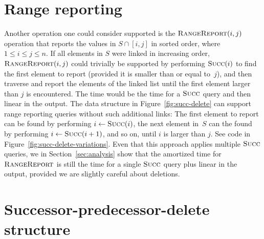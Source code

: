 \documentclass[a4paper]{lipics-v2021}
\newcommand{\FuncName}[1]{\textup{\textsc{#1}}}
\newcommand{\Succ}{\FuncName{Succ}}
\newcommand{\RangeReport}{\FuncName{RangeReport}}
\begin{document}
\section{Range reporting}
\label{sec:range}

Another operation one could consider supported is the $\RangeReport(i, j)$ operation that reports the values in $S \cap [i,j]$ in sorted order, where $1\leq i \leq j\leq n$. If all elements in $S$ were linked in increasing order, $\RangeReport(i, j)$ could trivially be supported by performing $\Succ(i)$ to find the first element to report (provided it is smaller than or equal to~$j$), and then traverse and report the elements of the linked list until the first element larger than $j$ is encountered. The time would be the time for a $\Succ$ query and then linear in the output. The data structure in Figure~\ref{fig:succ-delete} can support range reporting queries without such additional links: The first element to report can be found by performing $i\leftarrow\Succ(i)$, the next element in~$S$ can the found by performing $i\leftarrow\Succ(i+1)$, and so on, until $i$ is larger than $j$. See code in Figure~\ref{fig:succ-delete-variations}. Even that this approach applies multiple $\Succ$ queries, we in Section~\ref{sec:analysis} show that the amortized time for $\RangeReport$ is still the time for a single $\Succ$ query plus linear in the output, provided we are slightly careful about deletions.

\section{Successor-predecessor-delete structure}
\label{sec:succ-pred-delete}
\end{document}
